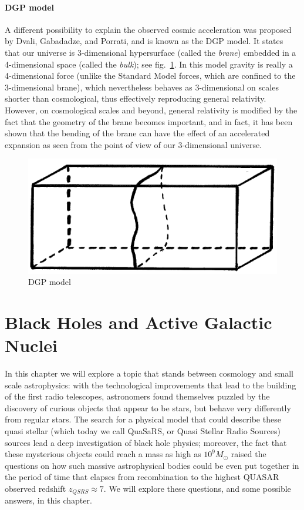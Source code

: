 \documentclass[11pt, a4paper,oneside,openright]{book}
\numberwithin{equation}{section}
\begin{document}
\subsubsection{DGP model}

A different possibility to explain the observed cosmic acceleration was proposed by Dvali, Gabadadze, and Porrati, and is known as the DGP model. It states that our universe is 3-dimensional hypersurface (called the {\it brane}) embedded in a 4-dimensional space (called the {\it bulk}); see fig.\ \ref{fig:lec10_10}. In this model gravity is really a 4-dimensional force (unlike the Standard Model forces, which are confined to the 3-dimensional brane), which nevertheless behaves as 3-dimensional on scales shorter than cosmological, thus effectively reproducing general relativity. However, on cosmological scales and beyond, general relativity is modified by the fact that the geometry of the brane becomes important, and in fact, it has been shown that the bending of the brane can have the effect of an accelerated expansion as seen from the point of view of our 3-dimensional universe.
\begin{figure}[ht]
\begin{center}
\includegraphics[scale=0.55]{Draw/lec10_10.png}
\end{center}
\caption{DGP model}
\label{fig:lec10_10}
\end{figure}

\chapter{Black Holes and Active Galactic Nuclei}
In this chapter we will explore a topic that stands between cosmology and small scale astrophysics: with the technological improvements that lead to the building of the first radio telescopes, astronomers found themselves puzzled by the discovery of curious objects that appear to be stars, but behave very differently from regular stars. The search for a physical model that could describe these quasi stellar (which today we call QuaSaRS, or Quasi Stellar Radio Sources) sources lead a deep investigation of black hole physics; moreover, the fact that these mysterious objects could reach a mass as high as $10^9 M_\odot$ raised the questions on how such massive astrophysical bodies could be even put together in the period of time that elapses from recombination to the highest QUASAR observed redshift $z_{QSRS}\approx7$. We will explore these questions, and some possible answers, in this chapter. 
\end{document}
